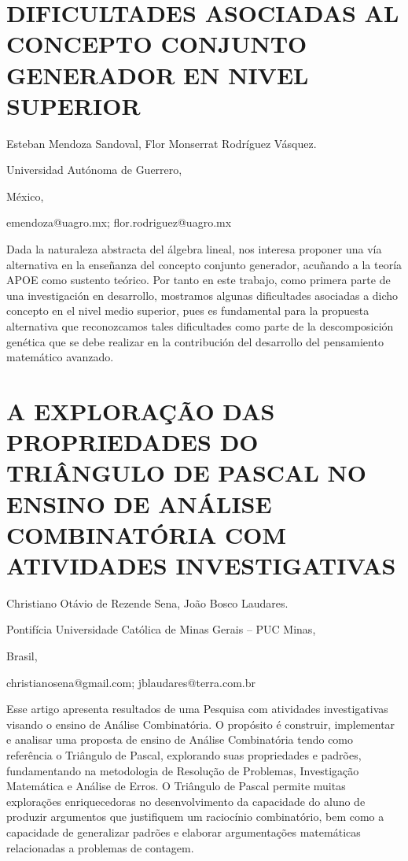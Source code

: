 \section{DIFICULTADES ASOCIADAS AL CONCEPTO CONJUNTO GENERADOR EN NIVEL SUPERIOR}

\begin{datos}

Esteban Mendoza Sandoval, Flor Monserrat Rodríguez Vásquez.

Universidad Autónoma de Guerrero,

México,

emendoza@uagro.mx; flor.rodriguez@uagro.mx 

\end{datos}

Dada la naturaleza abstracta del álgebra lineal, nos interesa proponer
una vía alternativa en la enseñanza del concepto conjunto generador,
acuñando a la teoría APOE como sustento teórico. Por tanto en este
trabajo, como primera parte de una investigación en desarrollo, mostramos
algunas dificultades asociadas a dicho concepto en el nivel medio
superior, pues es fundamental para la propuesta alternativa que reconozcamos
tales dificultades como parte de la descomposición genética que se
debe realizar en la contribución del desarrollo del pensamiento matemático
avanzado. 


\section{A EXPLORAÇÃO DAS PROPRIEDADES DO TRIÂNGULO DE PASCAL NO ENSINO DE
ANÁLISE COMBINATÓRIA COM ATIVIDADES INVESTIGATIVAS}

\begin{datos}

Christiano Otávio de Rezende Sena, João Bosco Laudares.

Pontifícia Universidade Católica de Minas Gerais – PUC Minas,

Brasil,

christianosena@gmail.com; jblaudares@terra.com.br

\end{datos}

Esse artigo apresenta resultados de uma Pesquisa com atividades investigativas
visando o ensino de Análise Combinatória. O propósito é construir,
implementar e analisar uma proposta de ensino de Análise Combinatória
tendo como referência o Triângulo de Pascal, explorando suas propriedades
e padrões, fundamentando na metodologia de Resolução de Problemas,
Investigação Matemática e Análise de Erros. O Triângulo de Pascal
permite muitas explorações enriquecedoras no desenvolvimento da capacidade
do aluno de produzir argumentos que justifiquem um raciocínio combinatório,
bem como a capacidade de generalizar padrões e elaborar argumentações
matemáticas relacionadas a problemas de contagem. 


